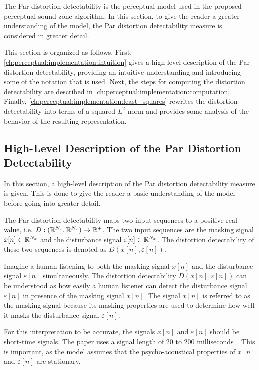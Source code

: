 The Par distortion detectability is the perceptual model used in the proposed perceptual sound zone algorithm.
In this section, to give the reader a greater understanding of the model, the Par distortion detectability measure is considered in greater detail.

This section is organized as follows.
First, \autoref{ch:perceptual:implementation:intuition} gives a high-level description of the Par distortion detectability, providing an intuitive understanding and introducing some of the notation that is used.
Next, the steps for computing the distortion detectability are described in 
\autoref{ch:perceptual:implementation:computation}.
Finally, \autoref{ch:perceptual:implementation:least_squares} rewrites the distortion detectability into terms of a squared $L^2$-norm and provides some analysis of the behavior of the resulting representation.

\subsection{High-Level Description of the Par Distortion Detectability}
\label{ch:perceptual:implementation:intuition}
In this section, a high-level description of the Par distortion detectability measure is given.
This is done to give the reader a basic understanding of the model before going into greater detail.

The Par distortion detectability maps two input sequences to a positive real value, i.e. $D: (\mathbb{R}^{N_x}, \mathbb{R}^{N_x})\mapsto \mathbb{R}^{+}$.
The two input sequences are the masking signal $x[n]\in\mathbb{R}^{N_x}$ and the disturbance signal $\varepsilon[n]\in\mathbb{R}^{N_x}$.
The distortion detectability of these two sequences is denoted as $D(x[n], \varepsilon[n])$. 

Imagine a human listening to both the masking signal $x[n]$ and the disturbance signal $\varepsilon[n]$ simultaneously.
The distortion detectability $D(x[n], \varepsilon[n])$ can be understood as how easily a human listener can detect the disturbance signal $\varepsilon[n]$ in presence of the masking signal $x[n]$.
The signal $x[n]$ is referred to as the masking signal because its masking properties are used to determine how well it masks the disturbance signal $\varepsilon[n]$.

For this interpretation to be accurate, the signals $x[n]$ and $\varepsilon[n]$ should be short-time signals.
The paper uses a signal length of 20 to 200 milliseconds~\cite{van2005perceptual}.    
This is important, as the model assumes that the psycho-acoustical properties of $x[n]$ and $\varepsilon[n]$ are stationary.  

